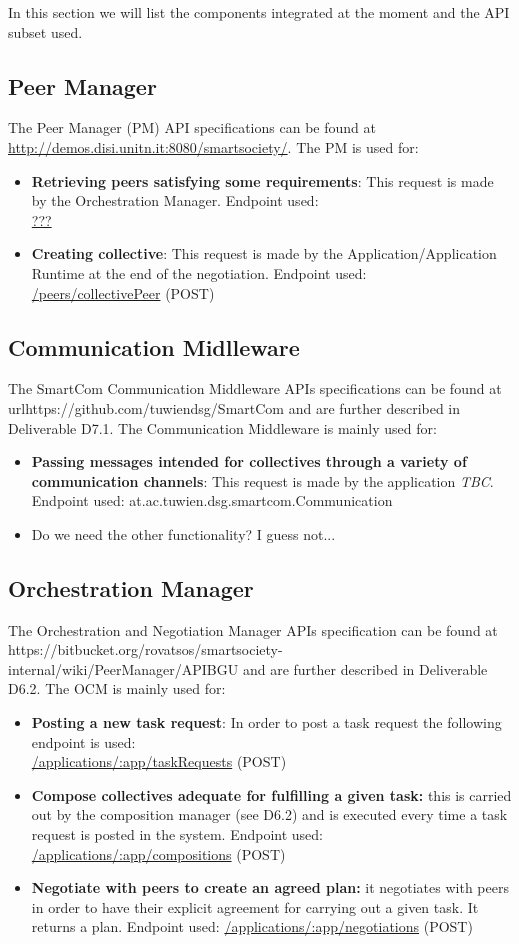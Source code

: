 In this section we will list the components integrated at the moment and the API subset used.

\subsection{Peer Manager}
The Peer Manager (PM) API specifications can be found at \url{http://demos.disi.unitn.it:8080/smartsociety/}. The PM is used for:
\begin{itemize}
\item {\bf Retrieving peers satisfying some requirements}: This request is made by the Orchestration Manager. Endpoint used:\\
	\url{???}
\item {\bf Creating collective}: This request is made by the Application/Application Runtime at the end of the negotiation. Endpoint used:\\
	\url{/peers/collectivePeer} (\textsc{POST})
\end{itemize}


\subsection{Communication Midlleware}
The SmartCom Communication Middleware APIs specifications can be found at 
url{https://github.com/tuwiendsg/SmartCom} and are further described in Deliverable D7.1. The Communication Middleware is mainly used for:
\begin{itemize}
\item {\bf Passing messages intended for collectives through a variety of communication channels}: This request is made by the application {\it TBC}. Endpoint used: {at.ac.tuwien.dsg.smartcom.Communication}
\item Do we need the other functionality? I guess not...
\end{itemize} 

\subsection{Orchestration Manager}
The Orchestration and Negotiation Manager APIs specification can be found at {https://bitbucket.org/rovatsos/smartsociety-internal/wiki/PeerManager/APIBGU} and are further described in Deliverable D6.2. The OCM is mainly used for:
\begin{itemize}
\item {\bf Posting a new task request}: In order to post a task request the following endpoint is used:\\
	\url{/applications/:app/taskRequests} (\textsc{POST})
\item {\bf Compose collectives adequate for fulfilling a given task:} this is carried out by the composition manager (see D6.2) and is executed every time a task request is posted in the system. Endpoint used:
  \url{/applications/:app/compositions} (\textsc{POST})
\item {\bf Negotiate with peers to create an agreed plan:} it negotiates with peers in order to have their explicit agreement for carrying out a given task. It returns a plan. Endpoint used:
  \url{/applications/:app/negotiations} (\textsc{POST})
\end{itemize}
